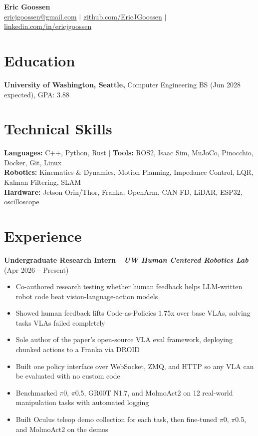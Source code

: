 \documentclass[letterpaper,11pt]{article}
\newcommand{\role}[4]{\textbf{#1} #4 \textbf{\textit{#2}} (#3)}
\begin{document}
\begin{center}
  {\fontsize{17}{20}\selectfont\textbf{Eric Goossen}}\\[2pt]
  \small
  \href{mailto:ericjgoossen@gmail.com}{ericjgoossen@gmail.com} $|$
  \href{https://github.com/EricJGoossen}{github.com/EricJGoossen} $|$
  \href{https://linkedin.com/in/ericjgoossen}{linkedin.com/in/ericjgoossen}
\end{center}
\vspace{-8pt}

\small

\section{Education}
\textbf{University of Washington, Seattle,} Computer Engineering BS (Jun 2028 expected), GPA: 3.88

\section{Technical Skills}
\textbf{Languages:} C++, Python, Rust \;$|$\; \textbf{Tools:} ROS2, Isaac Sim, MuJoCo, Pinocchio, Docker, Git, Linux\\
\textbf{Robotics:} Kinematics \& Dynamics, Motion Planning, Impedance Control, LQR, Kalman Filtering, SLAM\\
\textbf{Hardware:} Jetson Orin/Thor, Franka, OpenArm, CAN-FD, LiDAR, ESP32, oscilloscope

\section{Experience}
\role{Undergraduate Research Intern}{UW Human Centered Robotics Lab}{Apr 2026 -- Present}{--}
\begin{itemize}
  \item Co-authored research testing whether human feedback helps LLM-written robot code beat vision-language-action models
  \item Showed human feedback lifts Code-as-Policies 1.75x over base VLAs, solving tasks VLAs failed completely
  \item Sole author of the paper's open-source VLA eval framework, deploying chunked actions to a Franka via DROID
  \item Built one policy interface over WebSocket, ZMQ, and HTTP so any VLA can be evaluated with no custom code
  \item Benchmarked $\pi$0, $\pi$0.5, GR00T N1.7, and MolmoAct2 on 12 real-world manipulation tasks with automated logging
  \item Built Oculus teleop demo collection for each task, then fine-tuned $\pi$0, $\pi$0.5, and MolmoAct2 on the demos
\end{itemize}
\end{document}
